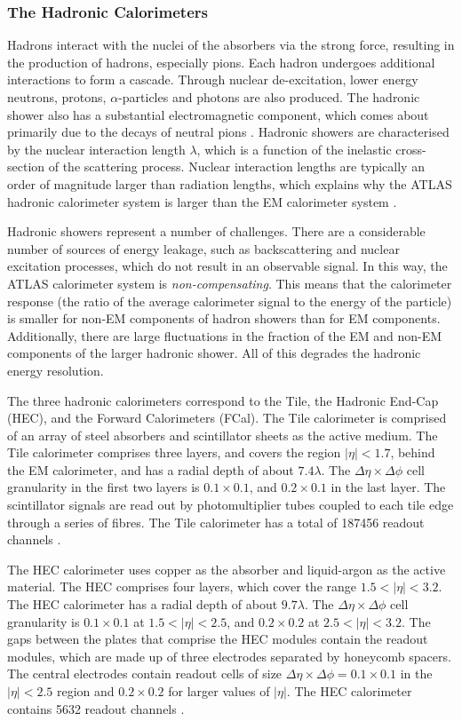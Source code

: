 \subsubsection{The Hadronic Calorimeters}

Hadrons interact with the nuclei of the absorbers via the strong force, resulting in the production of hadrons, especially pions. Each hadron undergoes additional interactions to form a cascade. Through nuclear de-excitation, lower energy neutrons, protons, $\alpha$-particles and photons are also produced. The hadronic shower also has a substantial electromagnetic component, which comes about primarily due to the decays of neutral pions \cite{Atlas:particleintmatter}. Hadronic showers are characterised by the nuclear interaction length $\lambda$, which is a function of the inelastic cross-section of the scattering process. Nuclear interaction lengths are typically an order of magnitude larger than radiation lengths, which explains why the ATLAS hadronic calorimeter system is larger than the EM calorimeter system \cite{Buckley:PCP}.

Hadronic showers represent a number of challenges. There are a considerable number of sources of energy leakage, such as backscattering and nuclear excitation processes, which do not result in an observable signal. In this way, the ATLAS calorimeter system is \textit{non-compensating}. This means that the calorimeter response (the ratio of the average calorimeter signal to the energy of the particle) is smaller for non-EM components of hadron showers than for EM components. Additionally, there are large fluctuations in the fraction of the EM and non-EM components of the larger hadronic shower. All of this degrades the hadronic energy resolution. 

The three hadronic calorimeters correspond to the Tile, the Hadronic End-Cap (HEC), and the Forward Calorimeters (FCal). The Tile calorimeter is comprised of an array of steel absorbers and scintillator sheets as the active medium. The Tile calorimeter comprises three layers, and covers the region $|\eta|<1.7$, behind the EM calorimeter, and has a radial depth of about $7.4\lambda$. The $\Delta\eta\times\Delta\phi$ cell granularity in the first two layers is $0.1\times0.1$, and $0.2\times0.1$ in the last layer. The scintillator signals are read out by photomultiplier tubes coupled to each tile edge through a series of fibres. The Tile calorimeter has a total of 187456 readout channels \cite{Atlas:design}.

The HEC calorimeter uses copper as the absorber and liquid-argon as the active material. The HEC comprises four layers, which cover the range $1.5 < |\eta| < 3.2$. The HEC calorimeter has a radial depth of about $9.7\lambda$. The $\Delta\eta\times\Delta\phi$ cell granularity is $0.1\times0.1$ at $1.5<|\eta|<2.5$, and $0.2\times0.2$ at $2.5<|\eta|<3.2$. The gaps between the plates that comprise the HEC modules contain the readout modules, which are made up of three electrodes separated by honeycomb spacers. The central electrodes contain readout cells of size $\Delta\eta\times\Delta\phi=0.1\times0.1$ in the $|\eta|<2.5$ region and $0.2\times0.2$ for larger values of $|\eta|$. The HEC calorimeter contains 5632 readout channels \cite{ATLAS:HEC,Atlas:design}.

